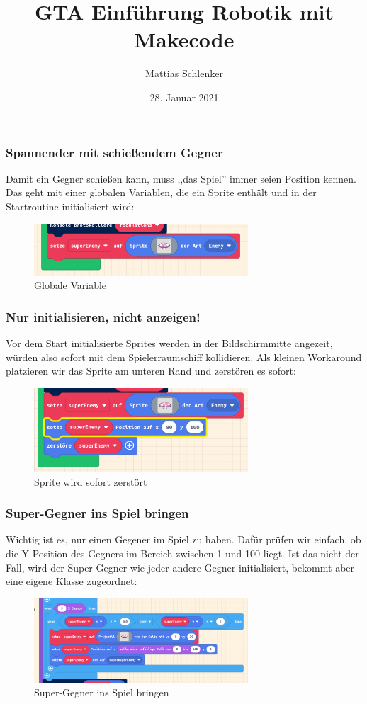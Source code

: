 \documentclass{beamer}
\title{GTA Einführung Robotik mit Makecode}
\author{Mattias Schlenker}
\institute{Wilhelm-Ostwald-Gymnasium}
\date{28. Januar 2021}
\begin{document}
\frame{\titlepage}

\begin{frame}
\frametitle{Spannender mit schießendem Gegner}

Damit ein Gegner schießen kann, muss ,,das Spiel'' immer seien Position kennen. Das geht mit einer globalen Variablen, die ein Sprite enthält und in der Startroutine initialisiert wird:
 
 \begin{figure}
  \includegraphics[width=8cm]{game19.png}
  \caption{Globale Variable}
  \label{fig:game19}
\end{figure}

\end{frame}

 \begin{frame}
 \frametitle{Nur initialisieren, nicht anzeigen!}
 
 Vor dem Start initialisierte Sprites werden in der Bildschirmmitte angezeit, würden also sofort mit dem Spielerraumschiff kollidieren. Als kleinen Workaround platzieren wir das Sprite am unteren Rand und zerstören es sofort: 
 
 \begin{figure}
  \includegraphics[width=8cm]{game20.png}
  \caption{Sprite wird sofort zerstört}
  \label{fig:game20}
\end{figure}

\end{frame}

 \begin{frame}
 \frametitle{Super-Gegner ins Spiel bringen}
Wichtig ist es, nur einen Gegener im Spiel zu haben. Dafür prüfen wir einfach, ob die Y-Position des Gegners im Bereich zwischen 1 und 100 liegt. Ist das nicht der Fall, wird der Super-Gegner wie jeder andere Gegner initialisiert, bekommt aber eine eigene Klasse zugeordnet:

 
 \begin{figure}
  \includegraphics[width=8cm]{game21.png}
  \caption{Super-Gegner ins Spiel bringen}
  \label{fig:game21}
\end{figure}
\end{frame}
\end{document}
